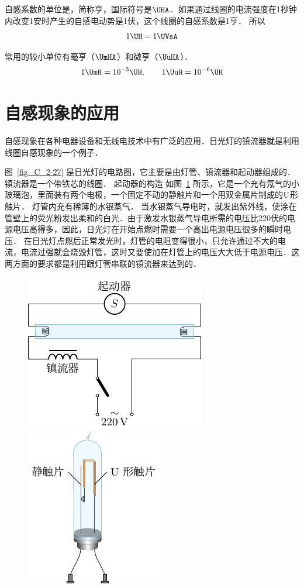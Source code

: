 自感系数的单位是，简称亨，国际符号是$\UHA
$．如果通过线圈的电流强度在1秒钟内改变1安时产生的自感电动势是1伏，这个线圈的自感系数是1亨．
所以
\[1 \UH =1 \UVsA\]

常用的较小单位有毫亨（$ \UmHA $）和微亨（$\UuHA$）．
\[1 \UmH =10^{-3}\UH,\qquad 1\UuH=10^{-6} \UH  \]

\section{自感现象的应用}
自感现象在各种电器设备和无线电技术中有广泛的应用．日光灯的镇流器就是利用线圈自感现象的一个例子．

图~\ref{fig_C_2-27} 是日光灯的电路图，它主要是由灯管、镇流器和起动器组成的．
镇流器是一个带铁芯的线圈．
起动器的构造
如图~\ref{fig_C_2-28} 所示，它是一个充有氖气的小玻璃泡，里面装有两个电极，一个固定不动的静触片和一个用双金属片制成的$\rm{U}$形触片．
灯管内充有稀薄的水银蒸气．
当水银蒸气导电时，就发出紫外线，使涂在管壁上的荧光粉发出柔和的白光．由于激发水银蒸气导电所需的电压比220伏的电源电压高得多，因此，日光灯在开始点燃时需要一个高出电源电压很多的瞬时电压．
在日光灯点燃后正常发光时，灯管的电阻变得很小，只允许通过不大的电流，电流过强就会烧毁灯管，这时又要使加在灯管上的电压大大低于电源电压．这两方面的要求都是利用跟灯管串联的镇流器来达到的．
\begin{figure}[htbp]
    \centering
    \begin{minipage}[t]{0.48\textwidth}
        \centering
        \includegraphics{fig/C/2-27.pdf}
        \caption{}\label{fig_C_2-27}
    \end{minipage}
    \begin{minipage}[t]{0.48\textwidth}
        \centering
        \includegraphics{fig/C/2-28.pdf}
        \caption{}\label{fig_C_2-28}
    \end{minipage}
\end{figure}

